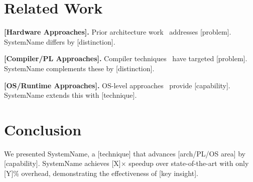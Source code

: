 \documentclass[sigplan,10pt]{acmart}
\newcommand{\system}{SystemName\xspace}
\newcommand{\para}[1]{\smallskip\noindent\textbf{#1.}}
\begin{document}
\section{Related Work}
\label{sec:related}

\para{[Hardware Approaches]}
Prior architecture work~\cite{jouppi2017tpu, kwon2018maeri} addresses
[problem]. \system differs by [distinction].

\para{[Compiler/PL Approaches]}
Compiler techniques~\cite{lattner2004llvm} have targeted [problem].
\system complements these by [distinction].

\para{[OS/Runtime Approaches]}
OS-level approaches~\cite{hennessy2019new} provide [capability].
\system extends this with [technique].

\section{Conclusion}
\label{sec:conclusion}

We presented \system, a [technique] that advances [arch/PL/OS area]
by [capability]. \system achieves [X]$\times$ speedup over
state-of-the-art with only [Y]\% overhead, demonstrating the
effectiveness of [key insight].




\end{document}
